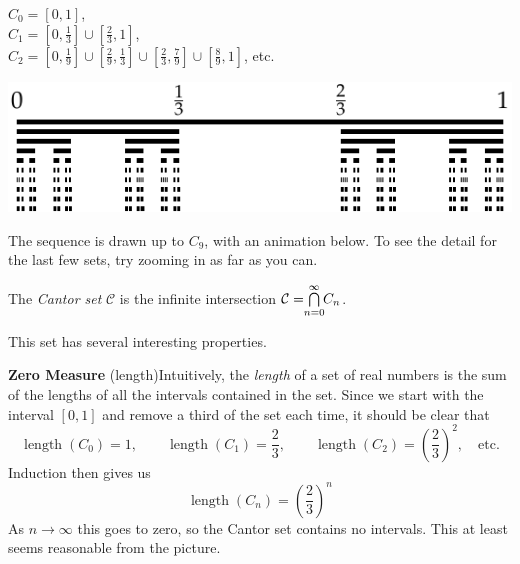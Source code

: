 \begin{minipage}[t]{0.40\linewidth}\vspace{0pt}
	$C_0=[0,1]$,\\[4pt]
	$C_1=[0,\frac 13]\cup [\frac 23,1]$,\\[4pt]
	$C_2=[0,\frac 19]\cup [\frac 29,\frac 13]\cup [\frac 23,\frac 79]\cup [\frac 89,1]$, etc.
\end{minipage}
\hfill
\begin{minipage}[t]{0.40\linewidth}\vspace{0pt}
	\includegraphics[width=\textwidth]{setsii-02-cantor}
\end{minipage}\par

The sequence is drawn up to $C_{9}$, with an animation below. To see the detail for the last few sets, try zooming in as far as you can.
\begin{center}
\end{center}\vspace{-8pt}

\begin{defn}{}{}
	The \emph{Cantor set} $\mathcal C$ is the infinite intersection $\mathcal C=\negthickspace\bigcap\limits_{n=0}^\infty\negthickspace C_n$.
\end{defn}

This set has several interesting properties.\par

{\bf Zero Measure} (length)\quad Intuitively, the \emph{length} of a set of real numbers is the sum of the lengths of all the intervals contained in the set. Since we start with the interval $[0,1]$ and remove a third of the set each time, it should be clear that
\[
	\operatorname{length}(C_0)=1,\qquad \operatorname{length}(C_1)=\frac 23,\qquad\operatorname{length}(C_2)=\left(\frac 23\right)^2,\quad\text{etc.}
\]
Induction then gives us
\[
	\operatorname{length}(C_n)=\left(\frac 23\right)^n
\]
As $n\to\infty$ this goes to zero, so the Cantor set contains no intervals. This at least seems reasonable from the picture.\par

